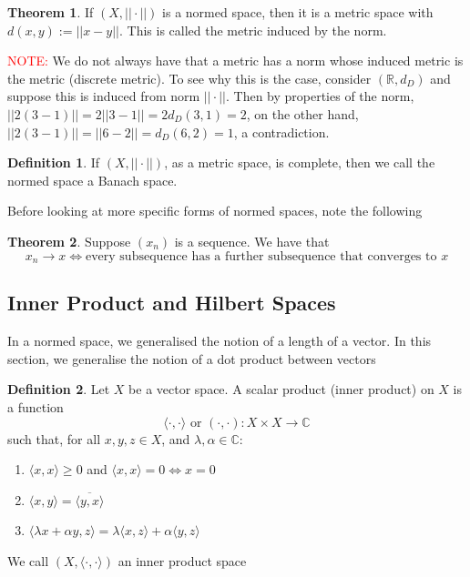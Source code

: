 \documentclass[11pt,a4paper]{article}
\theoremstyle{definition}
\newtheorem{definition}{Definition}[section]
\newtheorem{theorem}{Theorem}[section]
\begin{document}
\begin{theorem}
    If $(X, ||\cdot ||)$ is a normed space, then it is a metric space with $d(x,y) := ||x-y||$. This is called the metric induced by the norm. 
\end{theorem}

\noindent \textcolor{red}{NOTE:} We do not always have that a metric has a norm whose induced metric is the metric (discrete metric). To see why this is the case, consider $(\mathbb{R}, d_D)$ and suppose this is induced from norm $||\cdot ||$. Then by properties of the norm, $||2(3-1)|| = 2 ||3-1|| = 2d_D(3,1) = 2$, on the other hand, $||2(3-1)|| = ||6 - 2|| = d_D(6,2) = 1$, a contradiction. 

\begin{definition}
    If $(X, ||\cdot ||)$, as a metric space, is complete, then we call the normed space a Banach space.
\end{definition}
\noindent 
Before looking at more specific forms of normed spaces, note the following
\begin{theorem}
    Suppose $(x_n)$ is a sequence. We have that 
    \[
    x_n \to x \iff \text{every subsequence has a further subsequence that converges to } x
    \]
\end{theorem}

\subsection{Inner Product and Hilbert Spaces}
In a normed space, we generalised the notion of a length of a vector. In this section, we generalise the notion of a dot product between vectors

\begin{definition}
    Let $X$ be a vector space. A scalar product (inner product) on $X$ is a function 
    \[
    \langle \cdot , \cdot \rangle \text{ or } (\cdot , \cdot ):X\times X \to \mathbb{C}
    \]
    such that, for all $x,y,z \in X$, and $\lambda, \alpha \in \mathbb{C}$:
    \begin{enumerate}
        \item $\langle x,x\rangle  \ge 0$ and $\langle x,x\rangle = 0 \iff x=0$
        \item $\langle x,y \rangle = \overline{\langle y,x \rangle}$
        \item $\langle \lambda x + \alpha y, z \rangle = \lambda \langle x,z \rangle + \alpha \langle y,z \rangle$
    \end{enumerate}
    We call $(X, \langle \cdot , \cdot \rangle )$ an inner product space
\end{definition}
\end{document}
